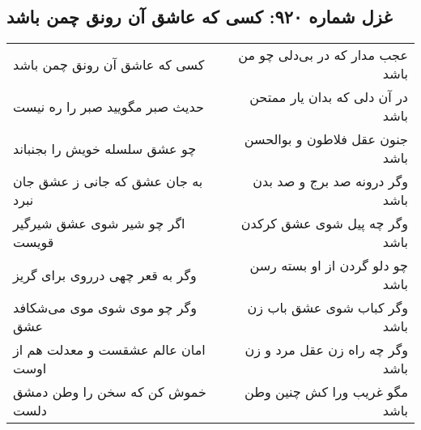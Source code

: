 \begin{center}
\section*{غزل شماره ۹۲۰: کسی که عاشق آن رونق چمن باشد}
\label{sec:0920}
\begin{longtable}{l p{0.5cm} r}
کسی که عاشق آن رونق چمن باشد
&&
عجب مدار که در بی‌دلی چو من باشد
\\
حدیث صبر مگویید صبر را ره نیست
&&
در آن دلی که بدان یار ممتحن باشد
\\
چو عشق سلسله خویش را بجنباند
&&
جنون عقل فلاطون و بوالحسن باشد
\\
به جان عشق که جانی ز عشق جان نبرد
&&
وگر درونه صد برج و صد بدن باشد
\\
اگر چو شیر شوی عشق شیرگیر قویست
&&
وگر چه پیل شوی عشق کرکدن باشد
\\
وگر به قعر چهی درروی برای گریز
&&
چو دلو گردن از او بسته رسن باشد
\\
وگر چو موی شوی موی می‌شکافد عشق
&&
وگر کباب شوی عشق باب زن باشد
\\
امان عالم عشقست و معدلت هم از اوست
&&
وگر چه راه زن عقل مرد و زن باشد
\\
خموش کن که سخن را وطن دمشق دلست
&&
مگو غریب ورا کش چنین وطن باشد
\\
\end{longtable}
\end{center}
